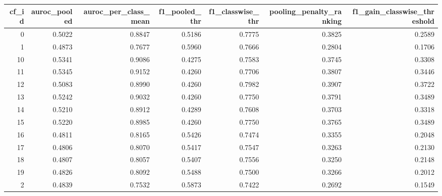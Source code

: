\begin{tabular}{rrrrrrr}
\toprule
 cf\_id &  auroc\_pooled &  auroc\_per\_class\_mean &  f1\_pooled\_thr &  f1\_classwise\_thr &  pooling\_penalty\_ranking &  f1\_gain\_classwise\_threshold \\
\midrule
     0 &        0.5022 &                0.8847 &         0.5186 &            0.7775 &                   0.3825 &                       0.2589 \\
     1 &        0.4873 &                0.7677 &         0.5960 &            0.7666 &                   0.2804 &                       0.1706 \\
    10 &        0.5341 &                0.9086 &         0.4275 &            0.7583 &                   0.3745 &                       0.3308 \\
    11 &        0.5345 &                0.9152 &         0.4260 &            0.7706 &                   0.3807 &                       0.3446 \\
    12 &        0.5083 &                0.8990 &         0.4260 &            0.7982 &                   0.3907 &                       0.3722 \\
    13 &        0.5242 &                0.9032 &         0.4260 &            0.7750 &                   0.3791 &                       0.3489 \\
    14 &        0.5210 &                0.8912 &         0.4289 &            0.7608 &                   0.3703 &                       0.3318 \\
    15 &        0.5220 &                0.8985 &         0.4260 &            0.7750 &                   0.3765 &                       0.3489 \\
    16 &        0.4811 &                0.8165 &         0.5426 &            0.7474 &                   0.3355 &                       0.2048 \\
    17 &        0.4806 &                0.8070 &         0.5417 &            0.7547 &                   0.3263 &                       0.2130 \\
    18 &        0.4807 &                0.8057 &         0.5407 &            0.7556 &                   0.3250 &                       0.2148 \\
    19 &        0.4826 &                0.8092 &         0.5488 &            0.7500 &                   0.3266 &                       0.2012 \\
     2 &        0.4839 &                0.7532 &         0.5873 &            0.7422 &                   0.2692 &                       0.1549 \\

\end{tabular}
